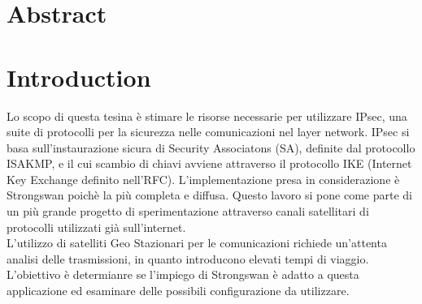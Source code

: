 \documentclass[
10pt, %
a4paper, %
oneside, %
headinclude,footinclude, %
BCOR5mm, %
]{scrartcl}
\title{\normalfont\spacedallcaps{IKEv2 Testing}}
\author{\spacedlowsmallcaps{Davide De Zuane \& Rahmi El Mechri}}
\date{}
\begin{document}
\renewcommand{\sectionmark}[1]{\markright{\spacedlowsmallcaps{#1}}}
\lehead{\mbox{\llap{\small\thepage\kern1em\color{halfgray} \vline}\color{halfgray}\hspace{0.5em}\rightmark\hfil}} 
\pagestyle{scrheadings} 

\maketitle
\newpage
\setcounter{tocdepth}{2} 
\tableofcontents 

\section*{Abstract} 


\newpage
\section{Introduction}
Lo scopo di questa tesina è stimare le risorse necessarie per utilizzare IPsec, una suite di protocolli per la sicurezza nelle comunicazioni nel layer network.
IPsec si basa sull'instaurazione sicura di Security Associatons (SA), definite dal protocollo ISAKMP, e il cui scambio di chiavi avviene attraverso il protocollo IKE (Internet Key Exchange definito nell'RFC\cite{rfc7296}).
L'implementazione presa in considerazione è Strongswan poichè la più completa e diffusa. 
Questo lavoro si pone come parte di un più grande progetto di sperimentazione attraverso canali satellitari di protocolli utilizzati già sull'internet.
\\

\noindent
L'utilizzo di satelliti Geo Stazionari per le comunicazioni richiede un'attenta analisi delle trasmissioni, in quanto introducono elevati tempi di viaggio.
L'obiettivo è determianre se l'impiego di Strongswan è adatto a questa applicazione ed esaminare delle possibili configurazione da utilizzare.
\\
\end{document}
